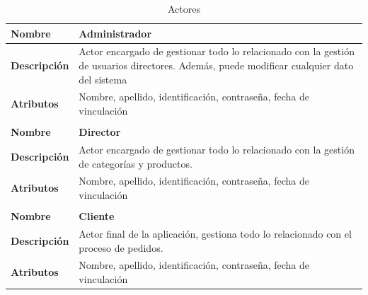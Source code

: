 \begin{center}
\begin{longtable}{p{2.5cm} p{12cm}}
\caption{Actores}
\label{table:Actores}
\\ \hline \hline

\textbf{Nombre} & \textbf{Administrador} \\ \hline
\textbf{Descripción} & Actor encargado de gestionar todo lo relacionado con la gestión de usuarios directores. Además, puede modificar cualquier dato del sistema \\ \hline
\textbf{Atributos} & Nombre, apellido, identificación, contraseña, fecha de vinculación \\ \hline \hline
\hline \\ \hline \hline

\textbf{Nombre} & \textbf{Director} \\ \hline
\textbf{Descripción} & Actor encargado de gestionar todo lo relacionado con la gestión de categorías y productos. \\ \hline
\textbf{Atributos} & Nombre, apellido, identificación, contraseña, fecha de vinculación \\ \hline \hline
\hline \\ \hline \hline

\textbf{Nombre} & \textbf{Cliente} \\ \hline
\textbf{Descripción} & Actor final de la aplicación, gestiona todo lo relacionado con el proceso de pedidos. \\ \hline
\textbf{Atributos} & Nombre, apellido, identificación, contraseña, fecha de vinculación \\ \hline \hline
\hline

\end{longtable}
\end{center}
